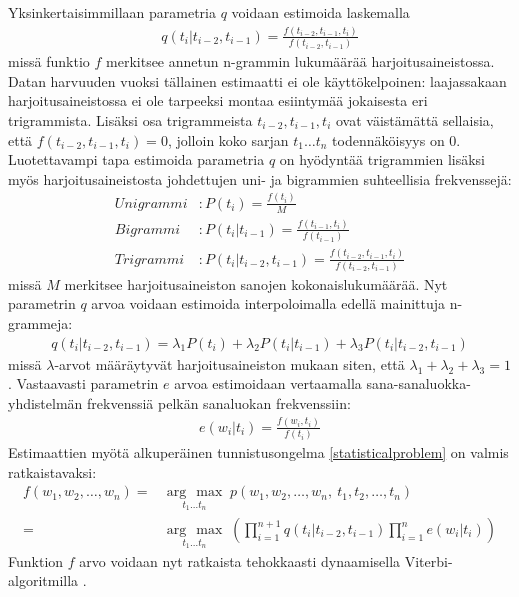 \documentclass[utf8,bachelor,manualbib]{gradu3}
\newcommand{\argmax}[1]{\underset{#1}{\operatorname{arg}\,\operatorname{max}}\;}
\begin{document}
Yksinkertaisimmillaan parametria $q$ voidaan estimoida laskemalla
\begin{align}
q(t_i|t_{i-2},t_{i-1}) = \frac{f(t_{i-2},t_{i-1},t_i)}{f(t_{i-2},t_{i-1})}
\end{align}
missä funktio $f$ merkitsee annetun n-grammin lukumäärää harjoitusaineistossa. Datan harvuuden vuoksi tällainen estimaatti ei ole käyttökelpoinen: laajassakaan harjoitusaineistossa ei ole tarpeeksi montaa esiintymää jokaisesta eri trigrammista. Lisäksi osa trigrammeista $t_{i-2},t_{i-1},t_i$ ovat väistämättä sellaisia, että $f(t_{i-2},t_{i-1},t_i) = 0$, jolloin koko sarjan $t_1 \ldots t_n$ todennäköisyys on $0$. Luotettavampi tapa estimoida parametria $q$ on hyödyntää trigrammien lisäksi myös harjoitusaineistosta johdettujen uni- ja bigrammien suhteellisia frekvenssejä:
\begin{align}
Unigrammi&: P(t_i) = \frac{f(t_i)}{M} \\
Bigrammi&: P(t_i | t_{i-1}) = \frac{f(t_{i-1}, t_i)}{f(t_{i-1})} \\
Trigrammi&: P(t_i | t_{i-2}, t_{i-1}) = \frac{f(t_{i-2},t_{i-1},t_i)}{f(t_{i-2},t_{i-1})}
\end{align}
missä $M$ merkitsee harjoitusaineiston sanojen kokonaislukumäärää. Nyt parametrin $q$ arvoa voidaan estimoida interpoloimalla edellä mainittuja n-grammeja:
\begin{align}
q(t_i | t_{i-2}, t_{i-1}) = \lambda_1 P(t_i) + \lambda_2 P(t_i | t_{i-1}) + \lambda_3 P(t_i | t_{i-2}, t_{i-1})
\end{align}
missä $\lambda$-arvot määräytyvät harjoitusaineiston mukaan siten, että $\lambda_1+\lambda_2+\lambda_3 = 1$. Vastaavasti parametrin $e$ arvoa estimoidaan vertaamalla sana-sanaluokka-yhdistelmän frekvenssiä pelkän sanaluokan frekvenssiin:
\begin{align}
e(w_i|t_i) = \frac{f(w_i, t_i)}{f(t_i)}
\label{hmm_param_e}
\end{align}
Estimaattien myötä alkuperäinen tunnistusongelma \eqref{statisticalproblem} on valmis ratkaistavaksi:
\begin{align}
f(w_1, w_2, \ldots, w_n) = & \argmax{t_1 \ldots t_n} p(w_1, w_2, \ldots, w_n,\: t_1, t_2, \ldots, t_n) \\
= & \argmax{t_1 \ldots t_n} \left(\prod_{i=1}^{n+1} q(t_i | t_{i-2}, t_{i-1}) \prod_{i=1}^{n}e(w_i | t_i) \right)
\end{align}
Funktion $f$ arvo voidaan nyt ratkaista tehokkaasti dynaamisella Viterbi-algoritmilla \citep{viterbi1967}. \citep{brants2000}
\end{document}

